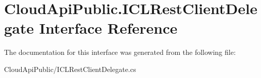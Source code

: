 \hypertarget{interface_cloud_api_public_1_1_i_c_l_rest_client_delegate}{\section{Cloud\-Api\-Public.\-I\-C\-L\-Rest\-Client\-Delegate Interface Reference}
\label{interface_cloud_api_public_1_1_i_c_l_rest_client_delegate}
}


The documentation for this interface was generated from the following file\-:\begin{DoxyCompactItemize}
\item 
Cloud\-Api\-Public/I\-C\-L\-Rest\-Client\-Delegate.\-cs\end{DoxyCompactItemize}

